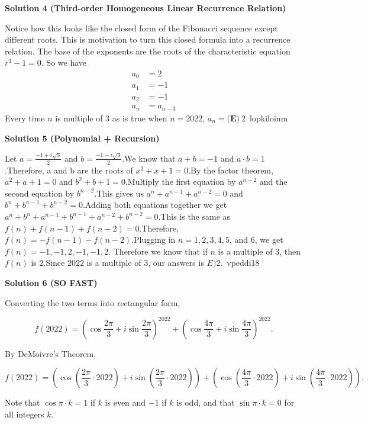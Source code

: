\begin{enumerate}
\textbf{Solution 4 (Third-order Homogeneous Linear Recurrence Relation)}

Notice how this looks like the closed form of the Fibonacci sequence except different roots. This is motivation to turn this closed formula into a recurrence relation. The base of the exponents are the roots of the characteristic equation $r^3-1=0$. So we have 
 \begin{align*} a_0&=2\\ a_1&=-1\\ a_2&=-1\\ a_n&=a_{n-3} \end{align*}
Every time $n$ is multiple of $3$ as is true when $n=2022$, $a_n= \boxed{\textbf{(E)} \ 2}$~lopkiloinm

 



\textbf{Solution 5 (Polynomial + Recursion)}

Let $a = \frac{-1+i\sqrt{3}}{2}$ and $b = \frac{-1-i\sqrt{3}}{2}$.We know that $a + b = -1$ and $a \cdot b = 1$.Therefore, a and b are the roots of $x^2 + x + 1 = 0$.By the factor theorem, $a^2 + a + 1 = 0$ and $b^2 + b + 1 = 0$.Multiply the first equation by $a^{n-2}$ and the second equation by $b^{n-2}$.This gives us $a^n + a^{n-1} + a^{n-2} = 0$ and $b^n + b^{n-1} + b^{n-2} = 0$.Adding both equations together we get $a^n + b^n + a^{n-1} + b^{n-1}+ a^{n-2} + b^{n-2} = 0$.This is the same as $f(n) + f(n-1) + f(n-2) = 0$.Therefore, $f(n) = -f(n-1) - f(n-2)$.Plugging in $n=1,2,3,4,5$, and $6$, we get $f(n) = -1, -1, 2, -1, -1, 2$. Therefore we know that if $n$ is a multiple of $3$, then $f(n)$ is $2$.Since $2022$ is a multiple of $3$, our answers is $E) 2$.~vpeddi18

 



\textbf{Solution 6 (SO FAST)}

Converting the two terms into rectangular form, 

 
 \[f(2022)=\left(\cos{\frac{2\pi}{3}}+i\sin{\frac{2\pi}{3}}\right)^{2022}+\left(\cos{\frac{4\pi}{3}}+i\sin{\frac{4\pi}{3}}\right)^{2022}.\]

 By DeMoivre's Theorem, 

 
 \[f(2022)=\left(\cos{\left(\frac{2\pi}{3}\cdot{2022}\right)}+i\sin{\left(\frac{2\pi}{3}\cdot{2022}\right)}\right)+\left(\cos{\left(\frac{4\pi}{3}\cdot{2022}\right)}+i\sin{\left(\frac{4\pi}{3}\cdot{2022}\right)}\right).\]

 Note that $\cos{\pi\cdot{k}}=1$ if $k$ is even and $-1$ if $k$ is odd, and that $\sin{\pi\cdot{k}}=0$ for all integers $k$. 


\end{enumerate}
